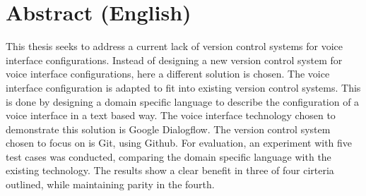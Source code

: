\chapter*{Abstract (English)}

This thesis seeks to address a current lack of version control systems for voice interface configurations. Instead of designing a new version control system for voice interface configurations, here a different solution is chosen. The voice interface configuration is adapted to fit into existing version control systems.
This is done by designing a domain specific language to describe the configuration of a voice interface in a text based way.
The voice interface technology chosen to demonstrate this solution is Google Dialogflow. The version control system chosen to focus on is Git, using Github.
For evaluation, an experiment with five test cases was conducted, comparing the domain specific language with the existing technology.
The results show a clear benefit in three of four cirteria outlined, while maintaining parity in the fourth.